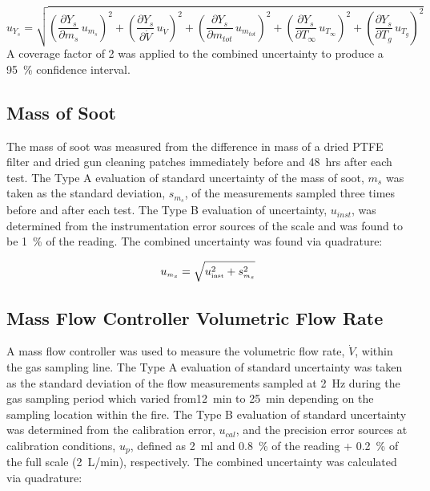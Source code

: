 \documentclass[12pt]{article}
\begin{document}
\begin{equation}
\label{eq:soot_mass_frac_uncertainty}
u_{\scriptscriptstyle Y_{s}} = \sqrt{{\left(\frac{\partial Y_{s}}{\partial m_{s}}\,u_{\scriptscriptstyle m_{s}} \right)}^2+{\left(\frac{\partial Y_{s}}{\partial \dot{V} }\,u_{\scriptscriptstyle \dot{V}} \right)}^2+{\left(\frac{\partial Y_{s}}{\partial m_{tot}}\,u_{\scriptscriptstyle m_{tot}} \right)}^2+{\left(\frac{\partial Y_{s}}{\partial T_{\infty}}\,u_{\scriptscriptstyle T_{\infty}} \right)}^2+{\left(\frac{\partial Y_{s}}{\partial T_{g}}\,u_{\scriptscriptstyle T_{g}} \right)}^2}
\end{equation}
A coverage factor of 2 was applied to the combined uncertainty to produce a 95~\% confidence interval.

\subsection{Mass of Soot}
\label{ssec:Mass_of_Soot}

The mass of soot was measured from the difference in mass of a dried PTFE filter and dried gun cleaning patches immediately before and \SI{48}{hrs} after each test. The Type A evaluation of standard uncertainty of the mass of soot, $m_{s}$ was taken as the standard deviation, $s_{m_{s}}$, of the measurements sampled three times before and after each test. The Type B evaluation of uncertainty, $u_{inst}$, was determined from the instrumentation error sources of the scale and was found to be 1~\% of the reading. The combined uncertainty was found via quadrature:

\begin{equation}
\label{eq:soot_mass_uncertainty}
u_{\scriptscriptstyle m_{s}} = \sqrt{u_{\rm \scriptscriptstyle inst}^2 + s_{\scriptscriptstyle m_{s}}^2}
\end{equation}

\subsection{Mass Flow Controller Volumetric Flow Rate}
\label{ssec:Mass_Flow_Controller_Volumetric_Flow_Rate}

A mass flow controller was used to measure the volumetric flow rate, $\dot{V}$, within the gas sampling line. The Type A evaluation of standard uncertainty was taken as the standard deviation of the flow measurements sampled at \SI{2}{Hz} during the gas sampling period which varied from\SI{12}{min} to \SI{25}{min} depending on the sampling location within the fire. The Type B evaluation of standard uncertainty was determined from the calibration error, $u_{cal}$, and the precision error sources at calibration conditions, $u_{p}$, defined as \SI{2}{ml} and 0.8~\% of the reading + 0.2~\% of the full scale (\SI{2}{L/min}), respectively. The combined uncertainty was calculated via quadrature:
\end{document}
